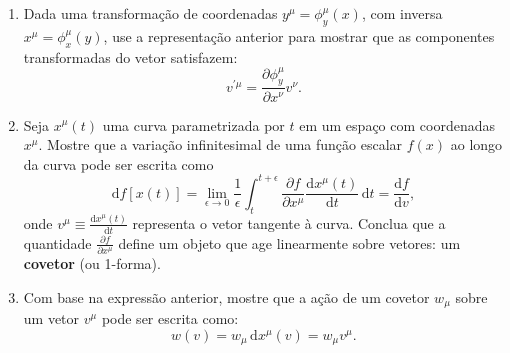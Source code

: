 \begin{enumerate}
\begin{enumerate}
                  \item Dada uma transformação de coordenadas $y^\mu = \phi_y^\mu(x)$,
                        com inversa $x^\mu = \phi_x^\mu(y)$, use a representação anterior para
                        mostrar que as componentes transformadas do vetor satisfazem:
                        $$
                              v^{\prime\mu} = \frac{\partial \phi_y^\mu}{\partial x^\nu} v^\nu.
                        $$
                  \item Seja $x^\mu(t)$ uma curva parametrizada por $t$ em um espaço com
                        coordenadas $x^\mu$. Mostre que a variação infinitesimal de uma
                        função escalar $f(x)$ ao longo da curva pode ser escrita como
                        $$
                              \mathrm{d}f[x(t)] = \lim_{\epsilon \to 0} \frac{1}{\epsilon} \int_t^{t+\epsilon} \frac{\partial f}{\partial x^\mu} \frac{\mathrm{d}x^\mu(t)}{\mathrm{d}t} \,\mathrm{d}t = \frac{\mathrm{d}f}{\mathrm{d}v},
                        $$
                        onde $v^\mu \equiv \frac{\mathrm{d}x^\mu(t)}{\mathrm{d}t}$
                        representa o vetor tangente à curva. Conclua que a quantidade
                        $\frac{\partial f}{\partial x^\mu}$ define um objeto que age
                        linearmente sobre vetores: um \textbf{covetor} (ou 1-forma).

                  \item Com base na expressão anterior, mostre que a ação de um covetor
                        $w_\mu$ sobre um vetor $v^\mu$ pode ser escrita como:
                        $$
                              w(v) = w_\mu \,\mathrm{d}x^\mu(v) = w_\mu v^\mu.
                        $$

            \end{enumerate}
\end{enumerate}

